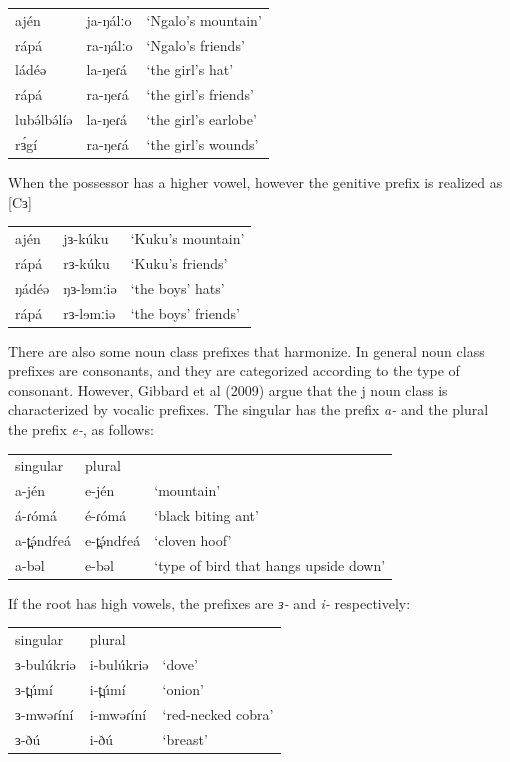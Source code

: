 \ea
\begin{tabular}[t]{lll}
	ajén 	&	ja-ŋálːo	&	‘Ngalo’s mountain’\\
	rápá 	&	ra-ŋálːo	&	‘Ngalo’s friends’\\
	ládéə 	&	la-ŋeɾá		&	‘the girl’s hat’\\
	rápá 	&	ra-ŋeɾá		&	‘the girl’s friends’	\\
	lubə́lbə́líə&	la-ŋeɾá		&	‘the girl’s earlobe’\\
	rɜ́gí 	&	ra-ŋeɾá		&	‘the girl’s wounds’\\
\end{tabular}
\z

When the possessor has a higher vowel, however the genitive prefix is realized as [Cɜ]
\ea
\begin{tabular}[t]{lll}
	ajén 	&	jɜ-kúku		&	‘Kuku’s mountain’\\
	rápá 	&	rɜ-kúku		&	‘Kuku’s friends’\\
	ŋádéə 	&	ŋɜ-lɘmːiə	&	‘the boys’ hats’\\
	rápá 	&	rɜ-lɘmːiə	&	‘the boys’ friends’\\
\end{tabular}
\z

There are also some noun class prefixes that harmonize. In general noun class prefixes are consonants, and they are categorized according to the type of consonant. However, Gibbard et al (2009) argue that the j noun class is characterized by vocalic prefixes. The singular has the prefix \textit{a-} and the plural the prefix \textit{e-}, as follows:

\ea
\begin{tabular}[t]{lll}
	singular	&	plural\\
	a-jén 	&	e-jén 	&	‘mountain’\\
	á-ɾómá 	&	é-ɾómá 	&	‘black biting ant’\\
	a-t̪ə́ndŕeá&	e-t̪ə́ndŕeá&	‘cloven hoof’\\
	a-bəl	&	e-bəl	&	‘type of bird that hangs upside down’\\
\end{tabular}
\z

If the root has high vowels, the prefixes are \textit{ɜ-} and \textit{i-} respectively:	

\ea
\begin{tabular}[t]{lll}
	singular	&	plural\\
	ɜ-bulúkriə 	&	i-bulúkriə 	&	‘dove’\\
	ɜ-t̪úmí 		&	i-t̪úmí 		&	‘onion’\\
	ɜ-mwəɾíní	&	i-mwəɾíní	&	‘red-necked cobra’\\
	ɜ-ðú		&	i-ðú			&	‘breast’\\
\end{tabular}
\z

